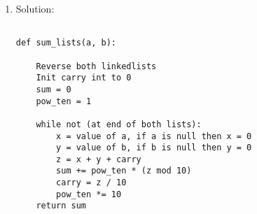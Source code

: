 \documentclass{article}
\begin{document}
\begin{enumerate}
\begin{lstlisting}
\end{lstlisting}

\item Solution:

\begin{lstlisting}

def sum_lists(a, b):

    Reverse both linkedlists
    Init carry int to 0
    sum = 0
    pow_ten = 1
    
    while not (at end of both lists):
        x = value of a, if a is null then x = 0
        y = value of b, if b is null then y = 0
        z = x + y + carry
        sum += pow_ten * (z mod 10)
        carry = z / 10
        pow_ten *= 10
    return sum
\end{lstlisting}

\end{enumerate}
\end{document}
